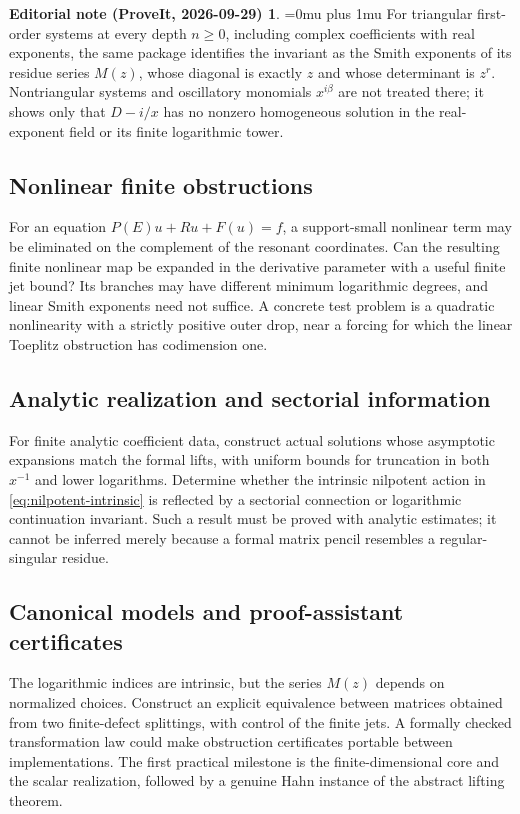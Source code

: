 \documentclass[11pt,a4paper]{article}
\numberwithin{equation}{section}
\theoremstyle{definition}
\theoremstyle{remark}
\theoremstyle{definition}
\newtheorem*{ednoteinner}{Editorial note (ProveIt, 2026-09-29)}
\newenvironment{ednote}{\begin{ednoteinner}\sloppy\Urlmuskip=0mu plus 1mu\relax}{\end{ednoteinner}}
\begin{document}
\begin{ednote}
For triangular first-order systems at every depth \(n\ge0\), including complex coefficients with real exponents, the same package \cite{ed:tri} identifies the invariant as the Smith exponents of its residue series \(M(z)\), whose diagonal is exactly \(z\) and whose determinant is \(z^r\). Nontriangular systems and oscillatory monomials \(x^{i\beta}\) are not treated there; it shows only that \(D-i/x\) has no nonzero homogeneous solution in the real-exponent field or its finite logarithmic tower.
\end{ednote}

\subsection{Nonlinear finite obstructions}
For an equation $P(E)u+Ru+F(u)=f$, a support-small nonlinear term may be eliminated on the complement of the resonant coordinates. Can the resulting finite nonlinear map be expanded in the derivative parameter with a useful finite jet bound? Its branches may have different minimum logarithmic degrees, and linear Smith exponents need not suffice. A concrete test problem is a quadratic nonlinearity with a strictly positive outer drop, near a forcing for which the linear Toeplitz obstruction has codimension one.

\subsection{Analytic realization and sectorial information}
For finite analytic coefficient data, construct actual solutions whose asymptotic expansions match the formal lifts, with uniform bounds for truncation in both $x^{-1}$ and lower logarithms. Determine whether the intrinsic nilpotent action in \eqref{eq:nilpotent-intrinsic} is reflected by a sectorial connection or logarithmic continuation invariant. Such a result must be proved with analytic estimates; it cannot be inferred merely because a formal matrix pencil resembles a regular-singular residue.

\subsection{Canonical models and proof-assistant certificates}
The logarithmic indices are intrinsic, but the series $M(z)$ depends on normalized choices. Construct an explicit equivalence between matrices obtained from two finite-defect splittings, with control of the finite jets. A formally checked transformation law could make obstruction certificates portable between implementations. The first practical milestone is the finite-dimensional core and the scalar realization, followed by a genuine Hahn instance of the abstract lifting theorem.
\end{document}
